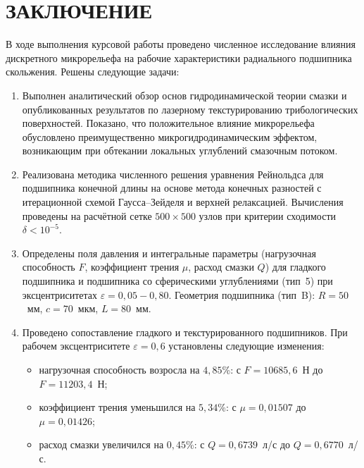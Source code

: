 \section*{ЗАКЛЮЧЕНИЕ}
{}

В ходе выполнения курсовой работы проведено численное исследование влияния дискретного микрорельефа на рабочие характеристики радиального подшипника скольжения. Решены следующие задачи:

\begin{enumerate}
    \item Выполнен аналитический обзор основ гидродинамической теории смазки и опубликованных результатов по лазерному текстурированию трибологических поверхностей. Показано, что положительное влияние микрорельефа обусловлено преимущественно микрогидродинамическим эффектом, возникающим при обтекании локальных углублений смазочным потоком.

    \item Реализована методика численного решения уравнения Рейнольдса для подшипника конечной длины на основе метода конечных разностей с итерационной схемой Гаусса--Зейделя и верхней релаксацией. Вычисления проведены на расчётной сетке $500 \times 500$ узлов при критерии сходимости $\delta < 10^{-5}$.

    \item Определены поля давления и интегральные параметры (нагрузочная способность $F$, коэффициент трения $\mu$, расход смазки $Q$) для гладкого подшипника и подшипника со сферическими углублениями (тип~5) при эксцентриситетах $\varepsilon = 0{,}05 - 0{,}80$. Геометрия подшипника (тип~B): $R = 50$~мм, $c = 70$~мкм, $L = 80$~мм.

    \item Проведено сопоставление гладкого и текстурированного подшипников. При рабочем эксцентриситете $\varepsilon = 0{,}6$ установлены следующие изменения:
    \begin{itemize}
        \item нагрузочная способность возросла на $4{,}85$\%: с $F = 10685{,}6$~Н до $F = 11203{,}4$~Н;
        \item коэффициент трения уменьшился на $5{,}34$\%: с $\mu = 0{,}01507$ до $\mu = 0{,}01426$;
        \item расход смазки увеличился на $0{,}45$\%: с $Q = 0{,}6739$~л/с до $Q = 0{,}6770$~л/с.
    \end{itemize}
\end{enumerate}


